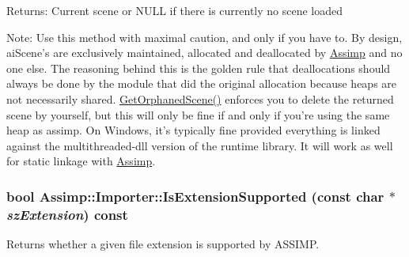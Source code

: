 \begin{Desc}
\item[Returns:]Current scene or NULL if there is currently no scene loaded \end{Desc}
\begin{Desc}
\item[Note:]Use this method with maximal caution, and only if you have to. By design, aiScene's are exclusively maintained, allocated and deallocated by \hyperlink{namespace_assimp}{Assimp} and no one else. The reasoning behind this is the golden rule that deallocations should always be done by the module that did the original allocation because heaps are not necessarily shared. \hyperlink{class_assimp_1_1_importer_60eb9042fb85bfbd61a863e131a56ecd}{GetOrphanedScene()} enforces you to delete the returned scene by yourself, but this will only be fine if and only if you're using the same heap as assimp. On Windows, it's typically fine provided everything is linked against the multithreaded-dll version of the runtime library. It will work as well for static linkage with \hyperlink{namespace_assimp}{Assimp}. \end{Desc}
\hypertarget{class_assimp_1_1_importer_9146ea75c33c0aac0310195346877388}{
\subsubsection[IsExtensionSupported]{\setlength{\rightskip}{0pt plus 5cm}bool Assimp::Importer::IsExtensionSupported (const char $\ast$ {\em szExtension}) const}}
\label{class_assimp_1_1_importer_9146ea75c33c0aac0310195346877388}


Returns whether a given file extension is supported by ASSIMP.

